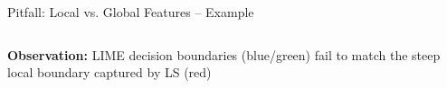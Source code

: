 \documentclass[11pt,compress,t,notes=noshow, aspectratio=169, xcolor=table]{beamer}
\begin{document}
\begin{frame}{Pitfall: Local vs. Global Features -- Example}
\begin{columns}[T, totalwidth=\textwidth]
\begin{column}{0.37\textwidth}
\textbf{Observation:} LIME decision boundaries (blue/green) fail to match the steep local boundary captured by LS (red)

  \end{column}
\end{columns}
        
\end{frame}
\end{document}
